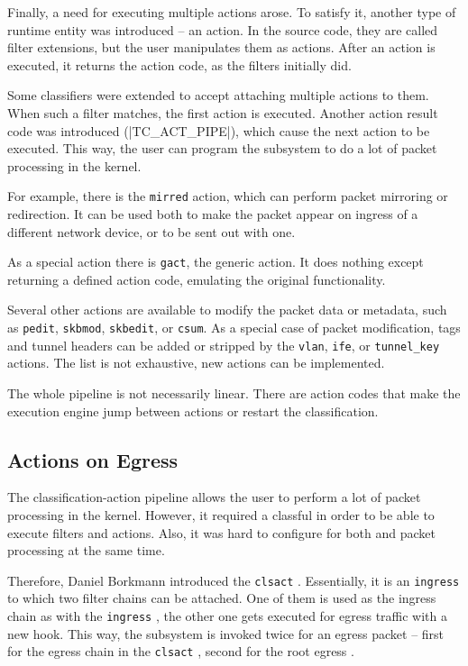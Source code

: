 Finally, a need for executing multiple actions arose. To satisfy it,
another type of runtime entity was introduced -- an action. In the source code,
they are called filter extensions, but the user manipulates them as
actions. After an action is executed, it returns the action code, as the
filters initially did.

Some classifiers were extended to accept attaching multiple actions to them. When such a
filter matches, the first action is executed. Another action result code was
introduced (\macro|TC_ACT_PIPE|), which cause the next action to be executed. This
way, the user can program the subsystem to do a lot of packet processing in the
kernel.

For example, there is the \texttt{mirred} action, which can perform packet
mirroring or redirection. It can be used both to make the packet appear on
ingress of a different network device, or to be sent out with one.

As a special action there is \texttt{gact}, the generic action. It does
nothing except returning a defined action code, emulating the original
functionality.

Several other actions are available to modify the packet data or metadata,
such as \texttt{pedit}, \texttt{skbmod}, \texttt{skbedit}, or \texttt{csum}. As
a special case of packet modification,  tags and tunnel headers can
be added or stripped by the \texttt{vlan}, \texttt{ife}, or \texttt{tunnel\_key}
actions. The list is not exhaustive, new actions can be implemented.

The whole pipeline is not necessarily linear. There are action codes that
make the execution engine jump between actions or restart the classification.

\subsection{Actions on Egress}

The classification-action pipeline allows the user to perform a lot of packet
processing in the kernel. However, it required a classful \qdisc{} in order to
be able to execute filters and actions. Also, it was hard to configure 
for both  and packet processing at the same time.

Therefore, Daniel Borkmann introduced the \texttt{clsact} \qdisc
\cite{linux-tc-clsact}. Essentially, it is an \texttt{ingress} \qdisc to which
two filter chains can be attached. One of them is used as the ingress chain as
with the \texttt{ingress} \qdisc, the other one gets executed for egress traffic
with a new hook. This way, the  subsystem is invoked twice for an egress
packet -- first for the egress chain in the \texttt{clsact} \qdisc, second for the
root egress \qdisc.

